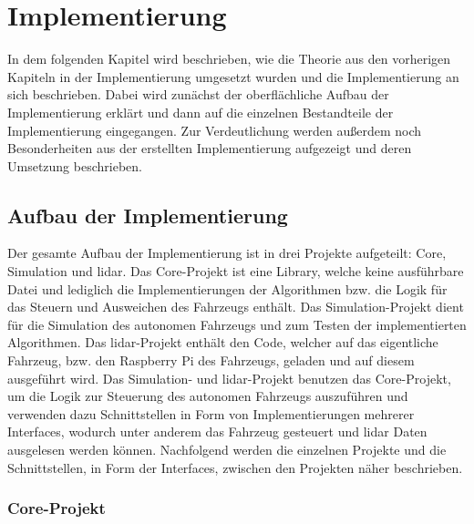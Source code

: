 \section{Implementierung}

In dem folgenden Kapitel wird beschrieben, wie die Theorie aus den vorherigen Kapiteln in der Implementierung umgesetzt wurden und die Implementierung an sich beschrieben. Dabei wird zunächst der oberflächliche Aufbau der Implementierung erklärt und dann auf die einzelnen Bestandteile der Implementierung eingegangen. Zur Verdeutlichung werden außerdem noch Besonderheiten aus der erstellten Implementierung aufgezeigt und deren Umsetzung beschrieben. 

\subsection{Aufbau der Implementierung}

Der gesamte Aufbau der Implementierung ist in drei Projekte aufgeteilt: Core, Simulation und \ac{lidar}. Das Core-Projekt ist eine Library, welche keine ausführbare Datei und lediglich die Implementierungen der Algorithmen bzw. die Logik für das Steuern und Ausweichen des Fahrzeugs enthält. Das Simulation-Projekt dient für die Simulation des autonomen Fahrzeugs und zum Testen der implementierten Algorithmen. Das \ac{lidar}-Projekt enthält den Code, welcher auf das eigentliche Fahrzeug, bzw. den Raspberry Pi des Fahrzeugs, geladen und auf diesem ausgeführt wird. Das Simulation- und \ac{lidar}-Projekt benutzen das Core-Projekt, um die Logik zur Steuerung des autonomen Fahrzeugs auszuführen und verwenden dazu Schnittstellen in Form von Implementierungen mehrerer Interfaces, wodurch unter anderem das Fahrzeug gesteuert und \ac{lidar} Daten ausgelesen werden können. Nachfolgend werden die einzelnen Projekte und die Schnittstellen, in Form der Interfaces, zwischen den Projekten näher beschrieben. 

\subsubsection{Core-Projekt}

